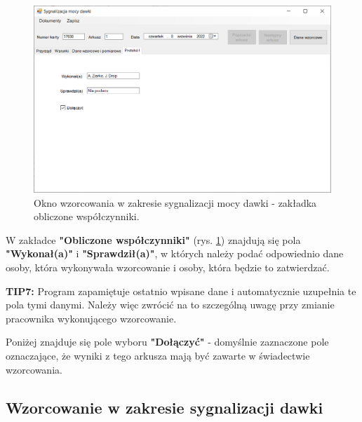 {{	\begin{figure}[htb]
		\centering
		\includegraphics[width=\columnwidth]{obrazki/Wzorcowanie/syg_mocy_dawki/wspolczynniki.png}
		\caption{Okno wzorcowania w zakresie sygnalizacji mocy dawki - zakładka obliczone współczynniki.}
		\label{sygMocyWspolczynniki}
	\end{figure}
	
	W zakładce \textbf{"Obliczone współczynniki"} (rys. \ref{sygMocyWspolczynniki}) znajdują się pola \textbf{"Wykonał(a)"} i \textbf{"Sprawdził(a)"}, w których należy podać odpowiednio dane osoby, która wykonywała wzorcowanie i osoby, która będzie to zatwierdzać. 
	
	\textbf{TIP7:} Program zapamiętuje ostatnio wpisane dane i automatycznie uzupełnia te pola tymi danymi. Należy więc zwrócić na to szczególną uwagę przy zmianie pracownika wykonującego wzorcowanie.
	
	Poniżej znajduje się pole wyboru \textbf{"Dołączyć"} - domyślnie zaznaczone pole oznaczające, że wyniki z tego arkusza mają być zawarte w świadectwie wzorcowania.

\subsection{Wzorcowanie w zakresie sygnalizacji dawki}
\label{wzorcowanie_syg_moc)
	
	W górnej części okna znajdują się wypełnione przez program pola \textbf{"Numer karty"}, \textbf{"Arkusz"} oraz \textbf{"Data"}. 
	
	\textbf{TIP:} Za datę wzorcowania program domyślnie przyjmuję datę dzisiejszą, dlatego warto wprowadzać wyniki w dniu pomiaru. Jeżeli wprowadzamy wyniki wzorcowania przeprowadzonego wcześniej, należy pamiętać o zmianie tej daty na tę odpowiadającą pomiarom.
	
}}}
